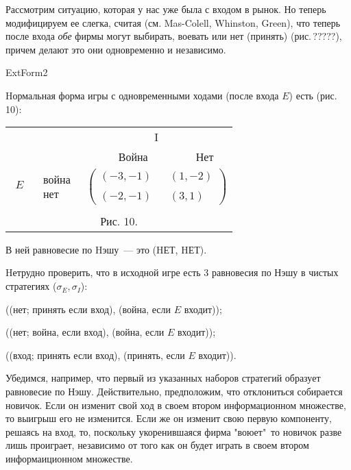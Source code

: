 Рассмотрим ситуацию, которая у нас уже была с входом в рынок. Но
теперь модифицируем ее слегка, считая (см. Mas-Colell, Whinston,
Green), что теперь после входа {\it обе} фирмы могут выбирать,
воевать или нет (принять) (рис.\,?????), причем делают это они
одновременно и независимо.

ExtForm2



Hормальная форма игры с одновременными ходами (после входа $E$) есть
(рис.\,10):

\begin{center}
\begin{tabular}{cccc}
&&\multicolumn{2}{c}{I}\\
&&\,\,\, Война &  Нет\\
$\begin{array}{c} {}\\ E\\ {}\\ \end{array}$ &$\begin{array}{c} война\\ \\  нет\end{array}$&
\multicolumn{2}{c}{$\left(\begin{array}{ccc}
(-3,-1)&&(1,-2)\\
\\
(-2,-1)&&(3,1) \end{array} \right)$}\\
\multicolumn{4}{c}{}\\
\multicolumn{4}{c}{Рис. 10.}\\
\end{tabular}
\end{center}

В ней равновесие по Hэшу~--- это (HЕТ, HЕТ).

Hетрудно проверить, что в исходной игре есть 3 равновесия по Нэшу в
чистых стратегиях ($\sigma_E,\sigma_I$):

((нет; принять если вход), (война, если $E$ входит));

((нет; война, если вход), (война, если $E$ входит));

((вход; принять если вход), (принять, если $E$ входит)).

Убедимся, например, что первый из указанных наборов стратегий
образует равновесие по Нэшу. Действительно, предположим, что
отклониться собирается новичок. Если он изменит свой ход в своем
втором информационном множестве, то выигрыш его не изменится.
Если же он изменит свою первую компоненту, решаясь на вход, то,
поскольку укоренившаяся фирма "воюет"\, то новичок разве лишь проиграет,
независимо от того как он будет играть в своем втором информаиционном
множестве.

